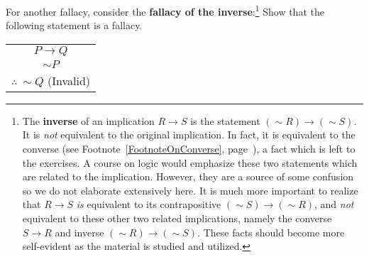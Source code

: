For another fallacy, consider the {\bf fallacy of the inverse}:\footnote{%
The {\bf inverse} of an implication $R\longrightarrow S$ is the statement
$(\sim R)\longrightarrow (\sim S)$.  It is {\it not} equivalent to the
original implication.  In fact, it is equivalent to the converse
(see Footnote~\ref{FootnoteOnConverse}, page~\pageref{FootnoteOnConverse}),
a fact which is left to the exercises.  A course on logic would 
emphasize these two statements which are related to the implication.
However, they are a source of some confusion so we do not elaborate
extensively here.  It is much more important to realize that
$R\longrightarrow S$ {\it is} equivalent to its contrapositive
$(\sim S)\longrightarrow(\sim R)$, and {\it not} equivalent to 
these other two related implications, namely the 
converse $S\longrightarrow R$ and inverse $(\sim R)\longrightarrow(\sim S)$.
These facts should become more self-evident as the material is studied
and utilized.
}
\bex Show that the following statement is a fallacy.
\begin{center}
\begin{tabular}{c}
$P\longrightarrow Q$\\
$\sim P$\\ \hline
$\therefore\ \sim Q$ (Invalid)
\end{tabular}
\end{center}

